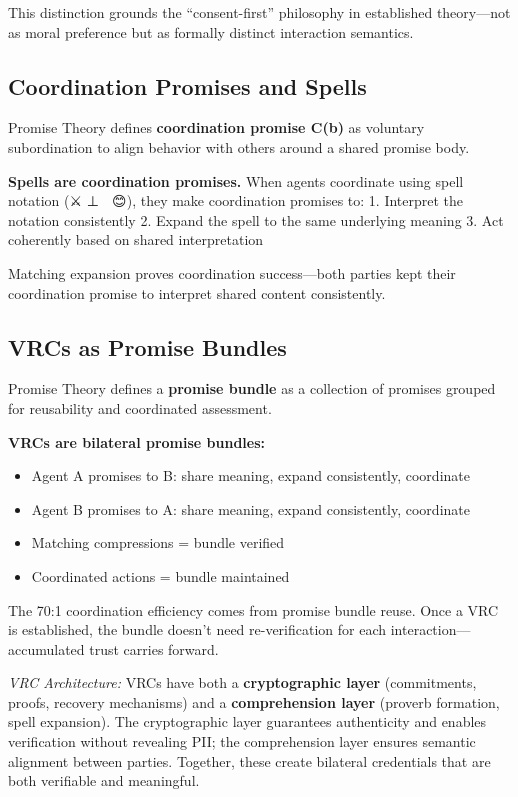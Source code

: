 \documentclass[
]{article}
\providecommand{\tightlist}{%
  \setlength{\itemsep}{0pt}\setlength{\parskip}{0pt}}
\begin{document}
This distinction grounds the ``consent-first'' philosophy in established
theory---not as moral preference but as formally distinct interaction
semantics.

\subsection{Coordination Promises and
Spells}\label{coordination-promises-and-spells}

Promise Theory defines \textbf{coordination promise C(b)} as voluntary
subordination to align behavior with others around a shared promise
body.

\textbf{Spells are coordination promises.} When agents coordinate using
spell notation (⚔️ ⊥ 🧙 \textbar{} 😊), they make coordination promises
to: 1. Interpret the notation consistently 2. Expand the spell to the
same underlying meaning 3. Act coherently based on shared interpretation

Matching expansion proves coordination success---both parties kept their
coordination promise to interpret shared content consistently.

\subsection{VRCs as Promise Bundles}\label{vrcs-as-promise-bundles}

Promise Theory defines a \textbf{promise bundle} as a collection of
promises grouped for reusability and coordinated assessment.

\textbf{VRCs are bilateral promise bundles:}

\begin{itemize}
\tightlist
\item
  Agent A promises to B: share meaning, expand consistently, coordinate
\item
  Agent B promises to A: share meaning, expand consistently, coordinate
\item
  Matching compressions = bundle verified
\item
  Coordinated actions = bundle maintained
\end{itemize}

The 70:1 coordination efficiency comes from promise bundle reuse. Once a
VRC is established, the bundle doesn't need re-verification for each
interaction---accumulated trust carries forward.

\emph{VRC Architecture:} VRCs have both a \textbf{cryptographic layer}
(commitments, proofs, recovery mechanisms) and a \textbf{comprehension
layer} (proverb formation, spell expansion). The cryptographic layer
guarantees authenticity and enables verification without revealing PII;
the comprehension layer ensures semantic alignment between parties.
Together, these create bilateral credentials that are both verifiable
and meaningful.
\end{document}
